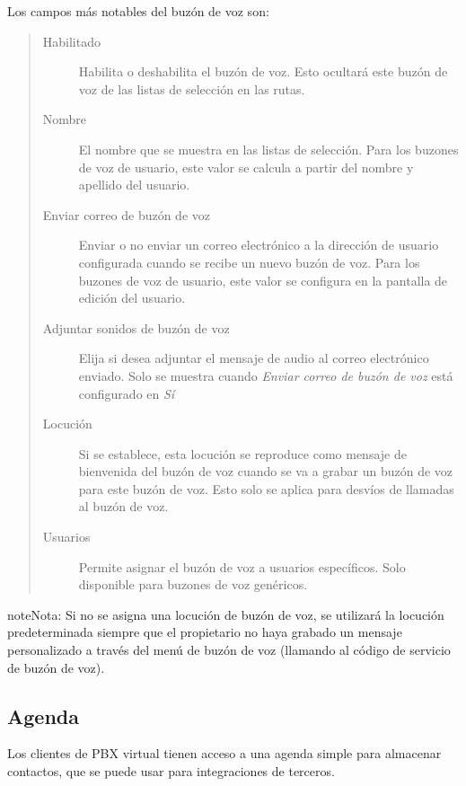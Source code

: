 \documentclass[letterpaper,10pt,spanish]{sphinxmanual}
\begin{document}
Los campos más notables del buzón de voz son:
\begin{quote}
\begin{description}
\item[{Habilitado}] \leavevmode
Habilita o deshabilita el buzón de voz. Esto ocultará este buzón de voz de las listas de selección en las rutas.

\item[{Nombre}] \leavevmode
El nombre que se muestra en las listas de selección. Para los buzones de voz de usuario, este valor se calcula a partir del nombre y apellido del usuario.

\item[{Enviar correo de buzón de voz}] \leavevmode
Enviar o no enviar un correo electrónico a la dirección de usuario configurada cuando se recibe un nuevo buzón de voz. Para los buzones de voz de usuario, este valor se configura en la pantalla de edición del usuario.

\item[{Adjuntar sonidos de buzón de voz}] \leavevmode
Elija si desea adjuntar el mensaje de audio al correo electrónico enviado. Solo se muestra cuando \emph{Enviar correo de buzón de voz} está configurado en \emph{Sí}

\item[{Locución}] \leavevmode
Si se establece, esta locución se reproduce como mensaje de bienvenida del buzón de voz cuando se va a grabar un buzón de voz para este buzón de voz. Esto solo se aplica para desvíos de llamadas al buzón de voz.

\item[{Usuarios}] \leavevmode
Permite asignar el buzón de voz a usuarios específicos. Solo disponible para buzones de voz genéricos.

\end{description}
\end{quote}

\begin{notice}{note}{Nota:}
Si no se asigna una locución de buzón de voz, se utilizará la locución predeterminada siempre que el propietario no haya grabado un mensaje personalizado a través del menú de buzón de voz (llamando al código de servicio de buzón de voz).
\end{notice}


\subsection{Agenda}
\label{administration_portal/client/vpbx/addressbook:address-book}\label{administration_portal/client/vpbx/addressbook::doc}
Los clientes de PBX virtual tienen acceso a una agenda simple para almacenar contactos, que se puede usar para integraciones de terceros.
\end{document}
